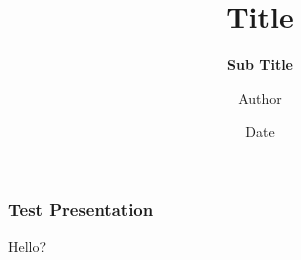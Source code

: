 \documentclass[aspectratio=169,11pt, dvipdfmx]{beamer}
\title{Title}
\subtitle{\bf Sub Title}
\author{Author}
\date[]{Date}
\institute{Institute or Organization}
\begin{document}
\begin{frame}
  \titlepage
\end{frame}

\begin{frame}
  \frametitle{Test Presentation}
  Hello?
\end{frame}
\end{document}
